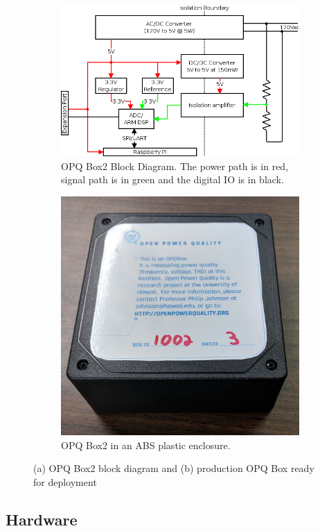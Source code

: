 \begin{figure}[h]
	\centering
	\begin{subfigure}{.5\textwidth}
	  \centering
	  \includegraphics[width=0.9\linewidth]{img/opqbox_diagram.png}
	  \caption{OPQ Box2 Block Diagram.
	  The power path is in red, signal path is in green and the digital IO is in black.}
	  \label{fig:opq:1:1}
	\end{subfigure}%
	\begin{subfigure}{.5\textwidth}
	  \centering
	  \includegraphics[width=0.7\linewidth]{img/opqbox_photo.jpg}
	  \caption{OPQ Box2 in an ABS plastic enclosure.}
	  \label{fig:opq:1:2}
	\end{subfigure}
	\caption{(a) OPQ Box2 block diagram and (b) production OPQ Box ready for deployment}
	\label{fig:opq:2}
\end{figure}

\subsection{Hardware}\label{subsec:hardware}

